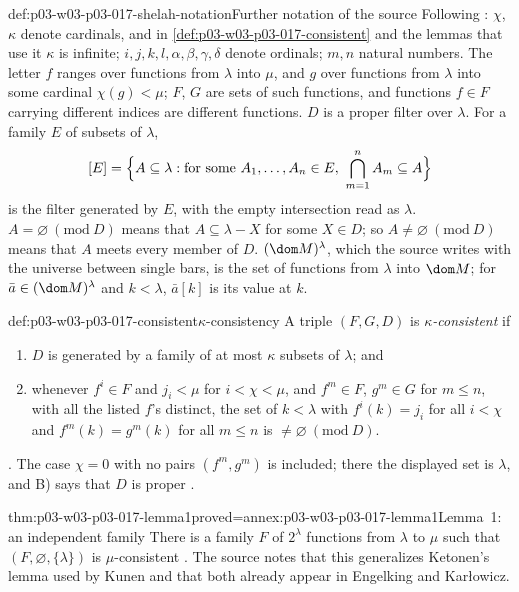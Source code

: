 \begin{hbconvention}{def:p03-w03-p03-017-shelah-notation}{Further notation of the source}
Following \cite[p.~225]{Shelah1971Ultrapowers}: \(\chi\), \(\kappa\) denote
cardinals, and in \cref{def:p03-w03-p03-017-consistent} and the lemmas
that use it \(\kappa\) is infinite; \(i,j,k,l,\alpha,\beta,\gamma,\delta\)
denote ordinals; \(m,n\) natural numbers.  The letter \(f\) ranges over functions from \(\lambda\) into
\(\mu\), and \(g\) over functions from \(\lambda\) into some cardinal
\(\chi(g)<\mu\); \(F\), \(G\) are sets of such functions, and functions
\(f\in F\) carrying different indices are different functions.  \(D\) is a
proper filter over \(\lambda\).  For a family \(E\) of subsets of
\(\lambda\),
\[
  [E]=\Bigl\{A\subseteq\lambda:\text{for some }A_1,\ldots,A_n\in E,\
  \bigcap_{m=1}^nA_m\subseteq A\Bigr\}
\]
is the filter generated by \(E\), with the empty intersection read as
\(\lambda\).  \(A=\varnothing\ (\mathrm{mod}\ D)\) means that
\(A\subseteq\lambda-X\) for some \(X\in D\); so
\(A\neq\varnothing\ (\mathrm{mod}\ D)\) means that \(A\) meets every member
of \(D\).  \((\dom M)^\lambda\), which the source writes with the universe
between single bars, is the set of functions from \(\lambda\) into
\(\dom M\); for \(\bar a\in(\dom M)^\lambda\) and \(k<\lambda\), \(\bar a[k]\)
is its value at \(k\).
\end{hbconvention}

\begin{hbdefinition}{def:p03-w03-p03-017-consistent}{\(\kappa\)-consistency}
A triple \((F,G,D)\) is \emph{\(\kappa\)-consistent} if
\begin{enumerate}
  \item[A)] \(D\) is generated by a family of at most \(\kappa\) subsets of
        \(\lambda\); and
  \item[B)] whenever \(f^i\in F\) and \(j_i<\mu\) for \(i<\chi<\mu\), and
        \(f^m\in F\), \(g^m\in G\) for \(m\le n\), with all the listed
        \(f\)'s distinct, the set of \(k<\lambda\) with \(f^i(k)=j_i\) for
        all \(i<\chi\) and \(f^m(k)=g^m(k)\) for all \(m\le n\) is
        \(\neq\varnothing\ (\mathrm{mod}\ D)\).
\end{enumerate}
\cite[p.~226, Definition~1]{Shelah1971Ultrapowers}.  The case \(\chi=0\)
with no pairs \((f^m,g^m)\) is included; there the displayed set is
\(\lambda\), and B) says that \(D\) is proper
\cite[p.~230]{Shelah1971Ultrapowers}.
\end{hbdefinition}

\begin{hblemma}{thm:p03-w03-p03-017-lemma1}{proved=annex:p03-w03-p03-017-lemma1}{Lemma~1: an independent family}
There is a family \(F\) of \(2^\lambda\) functions from \(\lambda\) to
\(\mu\) such that \((F,\varnothing,\{\lambda\})\) is \(\mu\)-consistent
\cite[p.~226, Lemma~1]{Shelah1971Ultrapowers}.  The source notes that this
generalizes Ketonen's lemma used by Kunen and that both already appear in
Engelking and Kar\l owicz.
\end{hblemma}

